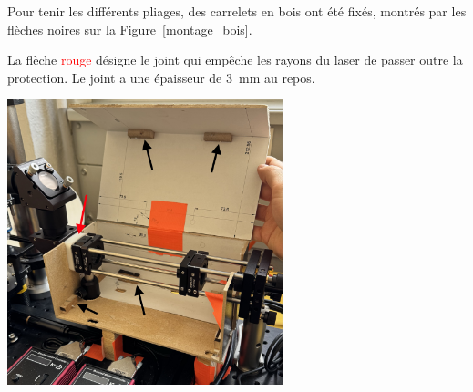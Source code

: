 \begin{minipage}{\textwidth}
    Pour tenir les différents pliages, des carrelets en bois ont été fixés, montrés par les flèches noires sur la Figure~\ref{montage_bois}.

    La flèche \textcolor{red}{rouge} désigne le joint qui empêche les rayons du laser de passer outre la protection. Le joint a une épaisseur de 3~mm au repos.
    \vspace{1em}
    \begin{center}
        \includegraphics[width=0.6\textwidth]{assets/figures/Protections_laser/Securite_mecanique/Protection_entree_laser/montage_bois.jpeg}
    \end{center}
    \label{montage_bois}
\end{minipage}
